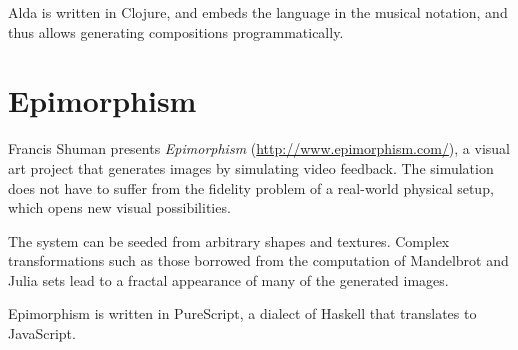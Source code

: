 \documentclass{sigplanconf}
\begin{document}
Alda is written in Clojure, and embeds the language in the musical
notation, and thus allows generating compositions programmatically.

\section{Epimorphism}

Francis Shuman presents \textit{Epimorphism} (\url{http://www.epimorphism.com/}), a visual art project that
generates images by simulating video feedback.  The simulation does
not have to suffer from the fidelity problem of a real-world physical
setup, which opens new visual possibilities.

The system can be seeded from arbitrary shapes and textures.  Complex
transformations such as those borrowed from the computation of
Mandelbrot and Julia sets lead to a fractal appearance of many of the
generated images.

Epimorphism is written in PureScript, a dialect of Haskell that
translates to JavaScript.
\end{document}
